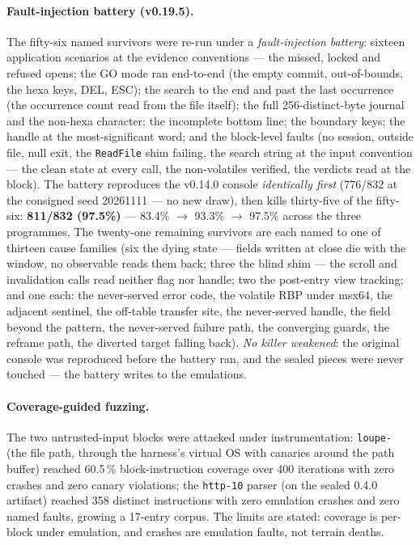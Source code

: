 \documentclass[10pt,a4paper]{article}
\newcommand{\code}[1]{\texttt{\small #1}}
\begin{document}
\paragraph{Fault-injection battery (v0.19.5).} The fifty-six named
survivors were re-run under a \emph{fault-injection battery}: sixteen
application scenarios at the evidence conventions --- the missed,
locked and refused opens; the GO mode ran end-to-end (the empty
commit, out-of-bounds, the hexa keys, DEL, ESC); the search to the end
and past the last occurrence (the occurrence count read from the file
itself); the full 256-distinct-byte journal and the non-hexa
character; the incomplete bottom line; the boundary keys; the handle
at the most-significant word; and the block-level faults (no session,
outside file, null exit, the \code{ReadFile} shim failing, the search
string at the input convention --- the clean state at every call, the
non-volatiles verified, the verdicts read at the block). The battery
reproduces the v0.14.0 console \emph{identically first} (776/832 at
the consigned seed 20261111 --- no new draw), then kills thirty-five
of the fifty-six: \textbf{811/832 (97.5\%)} --- 83.4\% $\rightarrow$
93.3\% $\rightarrow$ 97.5\% across the three programmes. The
twenty-one remaining survivors are each named to one of thirteen cause
families (six the dying state --- fields written at close die with the
window, no observable reads them back; three the blind shim --- the
scroll and invalidation calls read neither flag nor handle; two the
post-entry view tracking; and one each: the never-served error code,
the volatile RBP under msx64, the adjacent sentinel, the off-table
transfer site, the never-served handle, the field beyond the pattern,
the never-served failure path, the converging guards, the reframe
path, the diverted target falling back). \emph{No killer weakened}:
the original console was reproduced before the battery ran, and the
sealed pieces were never touched --- the battery writes to the
emulations.

\paragraph{Coverage-guided fuzzing.} The two untrusted-input blocks were
attacked under instrumentation: \code{loupe-} (the file path, through
the harness's virtual OS with canaries around the path buffer) reached
60.5\,\% block-instruction coverage over 400 iterations with zero crashes
and zero canary violations; the \code{http-10} parser (on the sealed 0.4.0
artifact) reached 358 distinct instructions with zero emulation crashes
and zero named faults, growing a 17-entry corpus. The limits are stated:
coverage is per-block under emulation, and crashes are emulation faults,
not terrain deaths.
\end{document}
